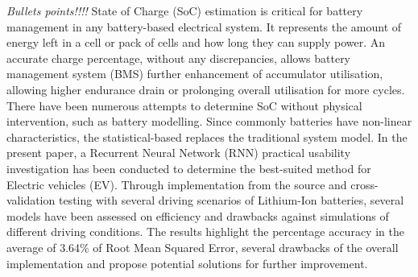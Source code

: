 %
{
    \textit{Bullets points!!!!}
State of Charge (SoC) estimation is critical for battery management in any battery-based electrical system.
It represents the amount of energy left in a cell or pack of cells and how long they can supply power.
An accurate charge percentage, without any discrepancies, allows battery management system (BMS) further enhancement of accumulator utilisation, allowing higher endurance drain or prolonging overall utilisation for more cycles.
There have been numerous attempts to determine SoC without physical intervention, such as battery modelling.
Since commonly batteries have non-linear characteristics, the statistical-based replaces the traditional system model.
In the present paper, a Recurrent Neural Network (RNN) practical usability investigation has been conducted to determine the best-suited method for Electric vehicles (EV).
Through implementation from the source and cross-validation testing with several driving scenarios of Lithium-Ion batteries, several models have been assessed on efficiency and drawbacks against simulations of different driving conditions.
The results highlight the percentage accuracy in the average of 3.64\% of Root Mean Squared Error, several drawbacks of the overall implementation and propose potential solutions for further improvement.
}